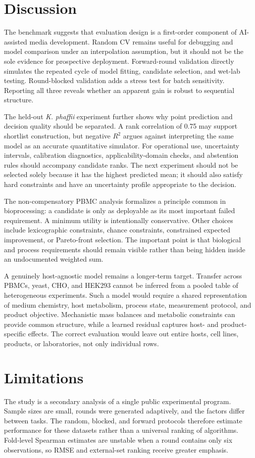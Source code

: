 \documentclass[11pt]{article}
\newcommand{\kp}{\textit{K. phaffii}}
\begin{document}
\section{Discussion}
The benchmark suggests that evaluation design is a first-order component of AI-assisted media development. Random CV remains useful for debugging and model comparison under an interpolation assumption, but it should not be the sole evidence for prospective deployment. Forward-round validation directly simulates the repeated cycle of model fitting, candidate selection, and wet-lab testing. Round-blocked validation adds a stress test for batch sensitivity. Reporting all three reveals whether an apparent gain is robust to sequential structure.

The held-out \kp{} experiment further shows why point prediction and decision quality should be separated. A rank correlation of 0.75 may support shortlist construction, but negative $R^2$ argues against interpreting the same model as an accurate quantitative simulator. For operational use, uncertainty intervals, calibration diagnostics, applicability-domain checks, and abstention rules should accompany candidate ranks. The next experiment should not be selected solely because it has the highest predicted mean; it should also satisfy hard constraints and have an uncertainty profile appropriate to the decision.

The non-compensatory PBMC analysis formalizes a principle common in bioprocessing: a candidate is only as deployable as its most important failed requirement. A minimum utility is intentionally conservative. Other choices include lexicographic constraints, chance constraints, constrained expected improvement, or Pareto-front selection. The important point is that biological and process requirements should remain visible rather than being hidden inside an undocumented weighted sum.

A genuinely host-agnostic model remains a longer-term target. Transfer across PBMCs, yeast, CHO, and HEK293 cannot be inferred from a pooled table of heterogeneous experiments. Such a model would require a shared representation of medium chemistry, host metabolism, process state, measurement protocol, and product objective. Mechanistic mass balances and metabolic constraints can provide common structure, while a learned residual captures host- and product-specific effects. The correct evaluation would leave out entire hosts, cell lines, products, or laboratories, not only individual rows.

\section{Limitations}
The study is a secondary analysis of a single public experimental program. Sample sizes are small, rounds were generated adaptively, and the factors differ between tasks. The random, blocked, and forward protocols therefore estimate performance for these datasets rather than a universal ranking of algorithms. Fold-level Spearman estimates are unstable when a round contains only six observations, so RMSE and external-set ranking receive greater emphasis.
\end{document}
